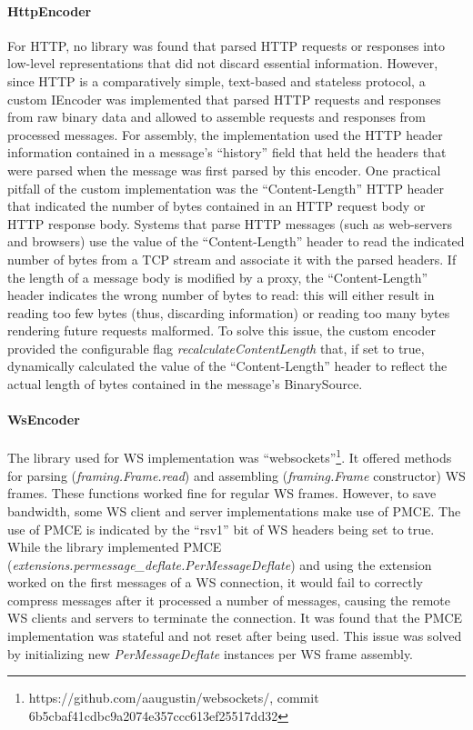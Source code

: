 \paragraph{HttpEncoder} For \ac{HTTP}, no library was found that parsed \ac{HTTP} requests or responses into low-level representations that did not discard essential information. However, since \ac{HTTP} is a comparatively simple, text-based and stateless protocol, a custom IEncoder was implemented that parsed \ac{HTTP} requests and responses from raw binary data and allowed to assemble requests and responses from processed messages. For assembly, the implementation used the \ac{HTTP} header information contained in a message's \enquote{history} field that held the headers that were parsed when the message was first parsed by this encoder. One practical pitfall of the custom implementation was the \enquote{Content-Length} \ac{HTTP} header that indicated the number of bytes contained in an \ac{HTTP} request body or \ac{HTTP} response body. Systems that parse \ac{HTTP} messages (such as web-servers and browsers) use the value of the \enquote{Content-Length} header to read the indicated number of bytes from a \ac{TCP} stream and associate it with the parsed headers. If the length of a message body is modified by a proxy, the \enquote{Content-Length} header indicates the wrong number of bytes to read: this will either result in reading too few bytes (thus, discarding information) or reading too many bytes rendering future requests malformed. To solve this issue, the custom encoder provided the configurable flag \emph{recalculateContentLength} that, if set to true, dynamically calculated the value of the \enquote{Content-Length} header to reflect the actual length of bytes contained in the message's BinarySource.
\paragraph{WsEncoder} The library used for \ac{WS} implementation was \enquote{websockets}\footnote{https://github.com/aaugustin/websockets/, commit 6b5cbaf41cdbc9a2074e357ccc613ef25517dd32}. It offered methods for parsing (\emph{framing.Frame.read}) and assembling (\emph{framing.Frame} constructor) \ac{WS} frames. These functions worked fine for regular \ac{WS} frames. However, to save bandwidth, some \ac{WS} client and server implementations make use of \ac{PMCE}. The use of \ac{PMCE} is indicated by the \enquote{rsv1} bit of \ac{WS} headers being set to true. While the library implemented \ac{PMCE} (\emph{extensions.permessage\_deflate.PerMessageDeflate}) and using the extension worked on the first messages of a \ac{WS} connection, it would fail to correctly compress messages after it processed a number of messages, causing the remote \ac{WS} clients and servers to terminate the connection. It was found that the \ac{PMCE} implementation was stateful and not reset after being used. This issue was solved by initializing new \emph{PerMessageDeflate} instances per \ac{WS} frame assembly.
